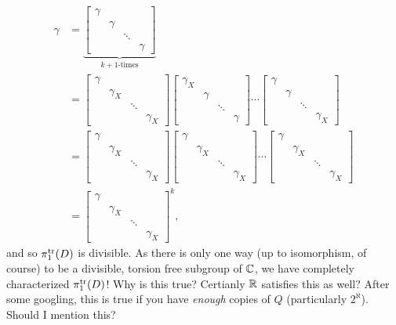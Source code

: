 \begin{align*}
  \gamma &= \underbrace{\begin{bmatrix} \gamma &&&\\ &\gamma&\\&&\ddots\\&&&\gamma\end{bmatrix}}_{k+1\textrm{-times}}\\
    &=\begin{bmatrix} \gamma &&&\\ &\gamma_X&\\&&\ddots\\&&&\gamma_X\end{bmatrix}
      \begin{bmatrix} \gamma_X &&&\\ &\gamma&\\&&\ddots\\&&&\gamma\end{bmatrix}\cdots
      \begin{bmatrix} \gamma &&&\\ &\gamma&\\&&\ddots\\&&&\gamma_X\end{bmatrix}\\
    &=\begin{bmatrix} \gamma &&&\\ &\gamma_X&\\&&\ddots\\&&&\gamma_X\end{bmatrix}
      \begin{bmatrix} \gamma &&&\\ &\gamma_X&\\&&\ddots\\&&&\gamma_X\end{bmatrix}\cdots
      \begin{bmatrix} \gamma &&&\\ &\gamma_X&\\&&\ddots\\&&&\gamma_X\end{bmatrix}\\
    &=\begin{bmatrix} \gamma &&&\\ &\gamma_X&\\&&\ddots\\&&&\gamma_X\end{bmatrix}^k,
\end{align*}
and so \(\pi_1^{\operatorname{tr}}(D)\) is divisible. As there is only one way (up to
isomorphism, of course) to be a divisible, torsion free subgroup of \(\mathbb{C}\), we
have completely characterized \(\pi_1^{\operatorname{tr}}(D)\)! {\color{red} Why is this true?
  Certianly \(\mathbb{R} \) satisfies this as well?} {\color{blue} After some googling,
this is true if you have \emph{enough} copies of \(Q\) (particularly
\(2^\aleph\)). Should I mention this?}

